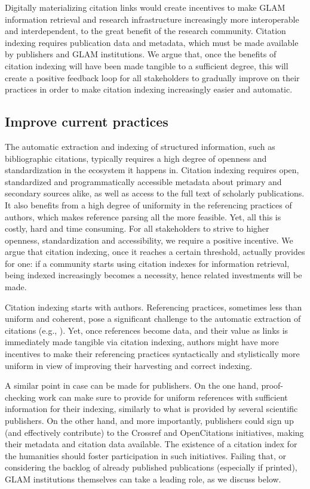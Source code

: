 Digitally materializing citation links would create incentives to make GLAM information retrieval and research infrastructure increasingly more interoperable and interdependent, to the great benefit of the research community. Citation indexing requires publication data and metadata, which must be made available by publishers and GLAM institutions. We argue that, once the benefits of citation indexing will have been made tangible to a sufficient degree, this will create a positive feedback loop for all stakeholders to gradually improve on their practices in order to make citation indexing increasingly easier and automatic.

\subsection{Improve current practices}
The automatic extraction and indexing of structured information, such as bibliographic citations, typically requires a high degree of openness and standardization in the ecosystem it happens in. Citation indexing requires open, standardized and programmatically accessible metadata about primary and secondary sources alike, as well as access to the full text of scholarly publications. It also benefits from a high degree of uniformity in the referencing practices of authors, which makes reference parsing all the more feasible. Yet, all this is costly, hard and time consuming. For all stakeholders to strive to higher openness, standardization and accessibility, we require a positive incentive. We argue that citation indexing, once it reaches a certain threshold, actually provides for one: if a community starts using citation indexes for information retrieval, being indexed increasingly becomes a necessity, hence related investments will be made.
 
Citation indexing starts with authors. Referencing practices, sometimes less than uniform and coherent, pose a significant challenge to the automatic extraction of citations (e.g., \cite{nederhof_bibliometric_2006}). Yet, once references become data, and their value as links is immediately made tangible via citation indexing, authors might have more incentives to make their referencing practices syntactically and stylistically more uniform in view of improving their harvesting and correct indexing.%
 
A similar point in case can be made for publishers. On the one hand, proof-checking work can make sure to provide for uniform references with sufficient information for their indexing, similarly to what is provided by several scientific publishers. On the other hand, and more importantly, publishers could sign up (and effectively contribute) to the Crossref and OpenCitations initiatives, making their metadata and citation data available. The existence of a citation index for the humanities should foster participation in such initiatives. Failing that, or considering the backlog of already published publications (especially if printed), GLAM institutions themselves can take a leading role, as we discuss below.
 
